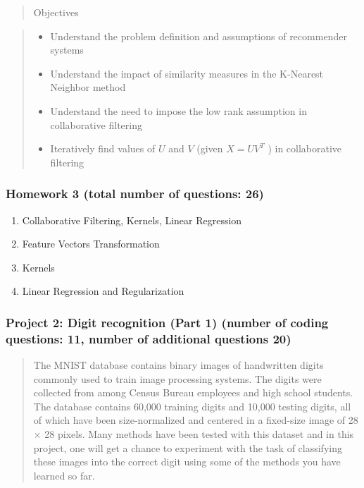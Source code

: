 \documentclass[]{article}
\providecommand{\tightlist}{%
  \setlength{\itemsep}{0pt}\setlength{\parskip}{0pt}}
\begin{document}
\begin{quote}
Objectives
\end{quote}

\begin{quote}
\begin{itemize}
\tightlist
\item
  Understand the problem definition and assumptions of recommender
  systems
\item
  Understand the impact of similarity measures in the K-Nearest Neighbor
  method
\item
  Understand the need to impose the low rank assumption in collaborative
  filtering
\item
  Iteratively find values of \(U\) and \(V\) (given \(X = UV^T\) ) in
  collaborative filtering
\end{itemize}
\end{quote}

\hypertarget{homework-3-total-number-of-questions-26}{%
\subsubsection{Homework 3 (total number of questions:
26)}\label{homework-3-total-number-of-questions-26}}

\begin{enumerate}
\def\labelenumi{\arabic{enumi}.}
\tightlist
\item
  Collaborative Filtering, Kernels, Linear Regression
\item
  Feature Vectors Transformation
\item
  Kernels
\item
  Linear Regression and Regularization
\end{enumerate}

\hypertarget{project-2-digit-recognition-part-1-number-of-coding-questions-11-number-of-additional-questions-20}{%
\subsubsection{Project 2: Digit recognition (Part 1) (number of coding
questions: 11, number of additional questions
20)}\label{project-2-digit-recognition-part-1-number-of-coding-questions-11-number-of-additional-questions-20}}

\begin{quote}
The MNIST database contains binary images of handwritten digits commonly
used to train image processing systems. The digits were collected from
among Census Bureau employees and high school students. The database
contains 60,000 training digits and 10,000 testing digits, all of which
have been size-normalized and centered in a fixed-size image of 28 × 28
pixels. Many methods have been tested with this dataset and in this
project, one will get a chance to experiment with the task of
classifying these images into the correct digit using some of the
methods you have learned so far.
\end{quote}
\end{document}
